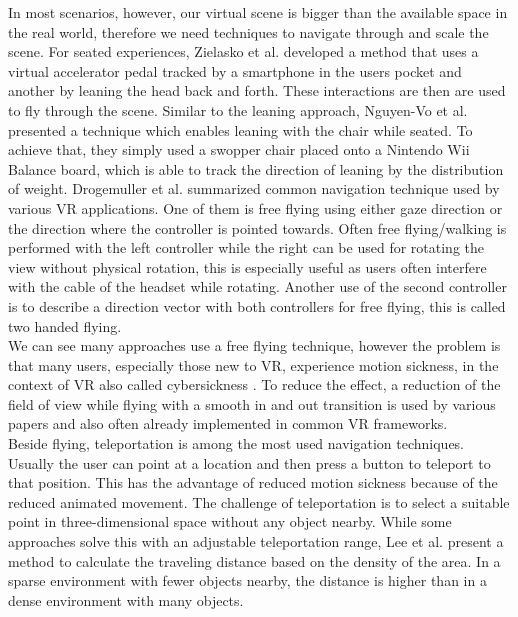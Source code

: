 In most scenarios, however, our virtual scene is bigger than the available space in the real world, therefore we need techniques to navigate through and scale the scene. For seated experiences, Zielasko et al. \cite{zielasko_remain_2017} developed a method that uses a virtual accelerator pedal tracked by a smartphone in the users pocket and another by leaning the head back and forth. These interactions are then are used to fly through the scene. Similar to the leaning approach, Nguyen-Vo et al. \cite{nguyen-vo_simulated_2018} presented a technique which enables leaning with the chair while seated. To achieve that, they simply used a swopper chair placed onto a Nintendo Wii Balance board, which is able to track the direction of leaning by the distribution of weight.  
Drogemuller et al. \cite{drogemuller_examining_2020} summarized common navigation technique used by various VR applications. One of them is free flying using either gaze direction or the direction where the controller is pointed towards. Often free flying/walking is performed with the left controller while the right can be used for rotating the view without physical rotation, this is especially useful as users often interfere with the cable of the headset while rotating. Another use of the second controller is to describe a direction vector with both controllers for free flying, this is called two handed flying.\\
We can see many approaches use a free flying technique, however the problem is that many users, especially those new to VR, experience motion sickness, in the context of VR also called cybersickness \cite{zielasko_remain_2017}.
To reduce the effect, a reduction of the field of view while flying with a smooth in and out transition is used by various papers and also often already implemented in common VR frameworks.\\
Beside flying, teleportation is among the most used navigation techniques. Usually the user can point at a location and then press a button to teleport to that position.
This has the advantage of reduced motion sickness because of the reduced animated movement. The challenge of teleportation is to select a suitable point in three-dimensional space without any object nearby. While some approaches solve this with an adjustable teleportation range, Lee et al. \cite{lee_evaluating_2020} present a method to calculate the traveling distance based on the density of the area. In a sparse environment with fewer objects nearby, the distance is higher than in a dense environment with many objects.\\
